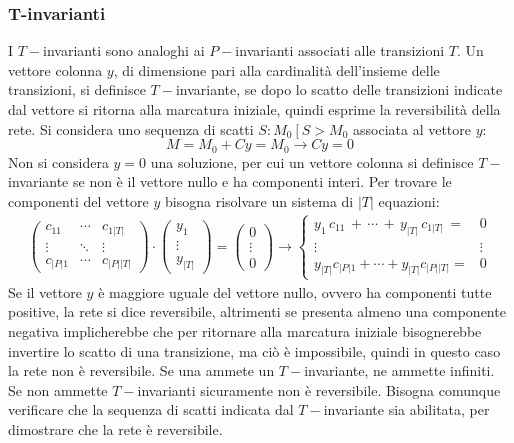 \documentclass{article}
\numberwithin{equation}{subsection}
\begin{document}
\subsubsection{T-invarianti}

I $T-$invarianti sono analoghi ai $P-$invarianti associati alle transizioni $T$. Un vettore colonna $y$, di dimensione pari alla cardinalità dell'insieme delle transizioni, 
si definisce $T-$invariante, se dopo lo scatto delle transizioni indicate dal vettore si ritorna alla marcatura iniziale, quindi esprime la reversibilità della rete. 
Si considera uno sequenza di scatti $S: M_0\left[\right.S>M_0$ associata al vettore $y$: 
\begin{equation}
    M=M_0+Cy=M_0\to Cy=0
\end{equation}
Non si considera $y=0$ una soluzione, per cui un vettore colonna si definisce $T-$invariante se non è il vettore nullo e ha componenti interi. Per trovare 
le componenti del vettore $y$ bisogna risolvare un sistema di $|T|$ equazioni: 
\begin{gather}
    \begin{pmatrix}
        c_{11} & \cdots & c_{1|T|}\\
        \vdots & \ddots & \vdots\\
        c_{|P|1} & \cdots & c_{|P||T|}
    \end{pmatrix}\cdot
    \begin{pmatrix}
        y_1\\
        \vdots\\
        y_{|T|}
    \end{pmatrix}=
    \begin{pmatrix}
        0\\
        \vdots\\
        0
    \end{pmatrix}\to
    \begin{cases}
        y_1\,c_{11}\,+\,\cdots\,+\,y_{|T|}\,c_{1|T|}\,=&0\\
        \vdots & \vdots\\
        y_{|T|}c_{|P|1}+\cdots+y_{|T|}c_{|P||T|}=&0
    \end{cases}
\end{gather}
Se il vettore $y$ è maggiore uguale del vettore nullo, ovvero ha componenti tutte positive, la rete si dice reversibile, altrimenti se presenta almeno una componente negativa 
implicherebbe che per ritornare alla marcatura iniziale bisognerebbe invertire lo scatto di una transizione, ma ciò è impossibile, quindi in questo caso la rete non è 
reversibile. Se una ammete un $T-$invariante, ne ammette infiniti. Se non ammette $T-$invarianti sicuramente non è reversibile. Bisogna comunque verificare che la sequenza di 
scatti indicata dal $T-$invariante sia abilitata, per dimostrare che la rete è reversibile. 
\end{document}
